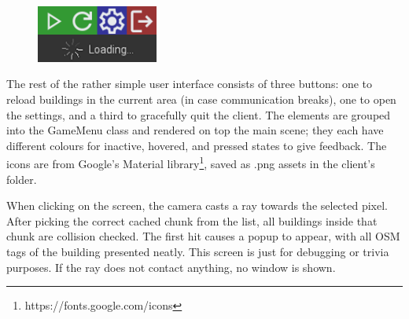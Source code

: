 \begin{figure}
    \includegraphics[width=4cm]{images/menu-buttons.png}
    \caption{}
\end{figure} 
The rest of the rather simple user interface consists of three buttons: one to reload buildings in the current area (in case communication breaks), one to open the settings, and a third to gracefully quit the client. The elements are grouped into the GameMenu class and rendered on top the main scene; they each have different colours for inactive, hovered, and pressed states to give feedback. The icons are from Google's Material library\footnote{https://fonts.google.com/icons}, saved as .png assets in the client's folder.


When clicking on the screen, the camera casts a ray towards the selected pixel. After picking the correct cached chunk from the list, all buildings inside that chunk are collision checked. The first hit causes a popup to appear, with all OSM tags of the building presented neatly. This screen is just for debugging or trivia purposes. If the ray does not contact anything, no window is shown.
